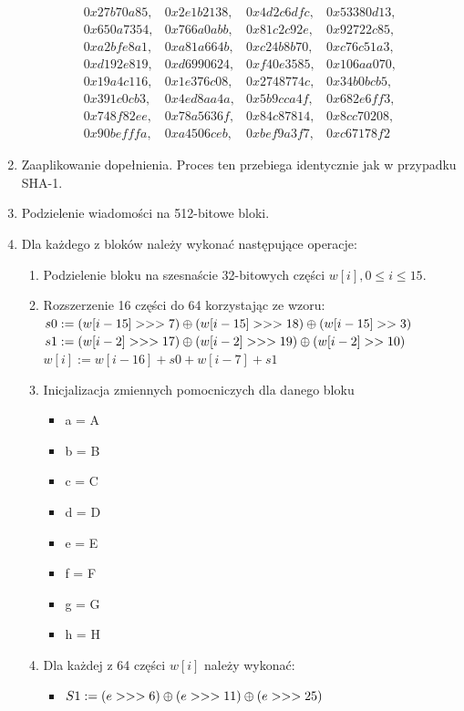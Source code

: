 \begin{enumerate}
$$\begin{matrix}
				0x27b70a85, & 0x2e1b2138, & 0x4d2c6dfc, & 0x53380d13, \\
				0x650a7354, & 0x766a0abb, & 0x81c2c92e, & 0x92722c85, \\
				0xa2bfe8a1, & 0xa81a664b, & 0xc24b8b70, & 0xc76c51a3, \\
				0xd192e819, & 0xd6990624, & 0xf40e3585, & 0x106aa070, \\
				0x19a4c116, & 0x1e376c08, & 0x2748774c, & 0x34b0bcb5, \\
				0x391c0cb3, & 0x4ed8aa4a, & 0x5b9cca4f, & 0x682e6ff3, \\
				0x748f82ee, & 0x78a5636f, & 0x84c87814, & 0x8cc70208, \\
				0x90befffa, & 0xa4506ceb, & 0xbef9a3f7, & 0xc67178f2  	
			\end{matrix}
			$$
	\item Zaaplikowanie dopełnienia. Proces ten przebiega identycznie jak w przypadku SHA-1.
	\item Podzielenie wiadomości na 512-bitowe bloki.
	\item Dla każdego z bloków należy wykonać następujące operacje:
		\begin{enumerate}
			\item Podzielenie bloku na szesnaście 32-bitowych części $w[i], 0 \leq i \leq 15$.
			\item Rozszerzenie 16 części do 64 korzystając ze wzoru: \\
				$s0 := (w[i-15] >>> 7) \mathbin{\oplus} (w[i-15] >>> 18) \mathbin{\oplus} (w[i-15] >> 3)$ \\
			    $s1 := (w[i-2] >>> 17) \mathbin{\oplus} (w[i-2] >>> 19) \mathbin{\oplus} (w[i-2] >> 10)$ \\
				$w[i] := w[i-16] + s0 + w[i-7] + s1$
			\item Inicjalizacja zmiennych pomocniczych dla danego bloku
				\begin{itemize}
					\item a = A
					\item b = B
					\item c = C
					\item d = D
					\item e = E
					\item f = F
					\item g = G
					\item h = H
				\end{itemize}
			\item Dla każdej z 64 części $w[i]$ należy wykonać:
				\begin{itemize}
					\item $S1 := (e >>> 6) \mathbin{\oplus} (e >>> 11) \mathbin{\oplus} (e >>> 25)$

\end{itemize}
\end{enumerate}
\end{enumerate}
